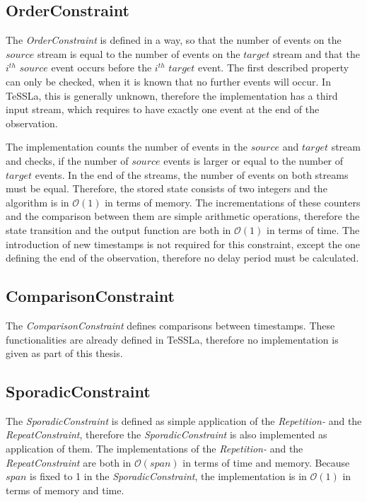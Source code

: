 \subsection{OrderConstraint}
	The \emph{OrderConstraint} is defined in a way, so that the number of events on the $source$ stream is equal to the number of events on the $target$ stream and that the $i^{th}$ $source$ event occurs before the  $i^{th}$ $target$ event. The first described property can only be checked, when it is known that no further events will occur. In TeSSLa, this is generally unknown, therefore the implementation has a third input stream, which requires to have exactly one event at the end of the observation.
	
	The implementation counts the number of events in the $source$ and $target$ stream and checks, if the number of $source$ events is larger or equal to the number of $target$ events. In the end of the streams, the number of events on both streams must be equal. Therefore, the stored state consists of two integers and the algorithm is in $\mathcal{O}(1)$ in terms of memory. The incrementations of these counters and the comparison between them are simple arithmetic operations, therefore the state transition and the output function are both in $\mathcal{O}(1)$ in terms of time. The introduction of new timestamps is not required for this constraint, except the one defining the end of the observation, therefore no delay period must be calculated.
	
\subsection{ComparisonConstraint}
	The \emph{ComparisonConstraint} defines comparisons between timestamps. These functionalities are already defined in TeSSLa, therefore no implementation is given as part of this thesis.  
	
\subsection{SporadicConstraint}
	The \emph{SporadicConstraint} is defined as simple application of the \emph{Repetition-} and the \emph{RepeatConstraint}, therefore the \emph{SporadicConstraint} is also implemented as application of them. The implementations of the \emph{Repetition-} and the \emph{RepeatConstraint} are both in $\mathcal{O}(span)$ in terms of time and memory. Because $span$ is fixed to 1 in the \textit{SporadicConstraint}, the implementation is in $\mathcal{O}(1)$ in terms of memory and time.
	
